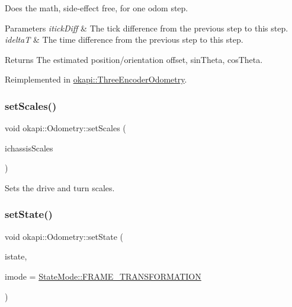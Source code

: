 Does the math, side-\/effect free, for one odom step.


\begin{DoxyParams}{Parameters}
{\em itick\+Diff} & The tick difference from the previous step to this step. \\
\hline
{\em ideltaT} & The time difference from the previous step to this step. \\
\hline
\end{DoxyParams}
\begin{DoxyReturn}{Returns}
The estimated position/orientation offset, sin\+Theta, cos\+Theta. 
\end{DoxyReturn}


Reimplemented in \mbox{\hyperlink{classokapi_1_1ThreeEncoderOdometry_a8c0811674b9da0623a3cece56a25cca6}{okapi\+::\+Three\+Encoder\+Odometry}}.

\mbox{\label{classokapi_1_1Odometry_a5330b093e51d650b8ff2c6fe0ec2d27e}} 
\subsubsection{\texorpdfstring{setScales()}{setScales()}}
{\footnotesize\ttfamily void okapi\+::\+Odometry\+::set\+Scales (\begin{DoxyParamCaption}\item[{const \mbox{\hyperlink{classokapi_1_1ChassisScales}{Chassis\+Scales}} \&}]{ichassis\+Scales }\end{DoxyParamCaption})\hspace{0.3cm}{\ttfamily [virtual]}}

Sets the drive and turn scales. \mbox{\label{classokapi_1_1Odometry_a0f18a0770477130307b7c6a9702b0cc6}} 
\subsubsection{\texorpdfstring{setState()}{setState()}}
{\footnotesize\ttfamily void okapi\+::\+Odometry\+::set\+State (\begin{DoxyParamCaption}\item[{const \mbox{\hyperlink{structokapi_1_1OdomState}{Odom\+State}} \&}]{istate,  }\item[{const \mbox{\hyperlink{namespaceokapi_af37fbd761bd859a00ff4dd4a87dd8c07}{State\+Mode}} \&}]{imode = {\ttfamily \mbox{\hyperlink{namespaceokapi_af37fbd761bd859a00ff4dd4a87dd8c07ad5ed7666e5cebf60d3af20a5a46edf3b}{State\+Mode\+::\+F\+R\+A\+M\+E\+\_\+\+T\+R\+A\+N\+S\+F\+O\+R\+M\+A\+T\+I\+ON}}} }\end{DoxyParamCaption})\hspace{0.3cm}{\ttfamily [virtual]}}


